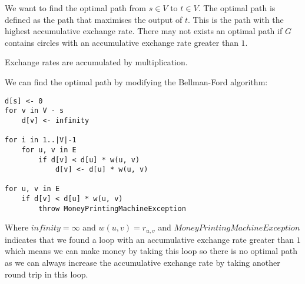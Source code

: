 \documentclass[12pt]{article}
\begin{document}
We want to find the optimal path from $s \in V$ to $t \in V$. The optimal path is defined as the path that maximises the output of $t$. This is the path with the highest accumulative exchange rate. There may not exists an optimal path if $G$ contains circles with an accumulative exchange rate greater than $1$.

Exchange rates are accumulated by multiplication.

We can find the optimal path by modifying the Bellman-Ford algorithm:

\begin{lstlisting}
d[s] <- 0
for v in V - s
	d[v] <- infinity

for i in 1..|V|-1
	for u, v in E
		if d[v] < d[u] * w(u, v)
			d[v] <- d[u] * w(u, v)

for u, v in E
	if d[v] < d[u] * w(u, v)
		throw MoneyPrintingMachineException
\end{lstlisting}

Where $infinity = \infty$ and $w(u, v) = r_{u, v}$ and $MoneyPrintingMachineException$ indicates that we found a loop with an accumulative exchange rate greater than $1$ which means we can make money by taking this loop so there is no optimal path as we can always increase the accumulative exchange rate by taking another round trip in this loop.

\section{} %
\end{document}
